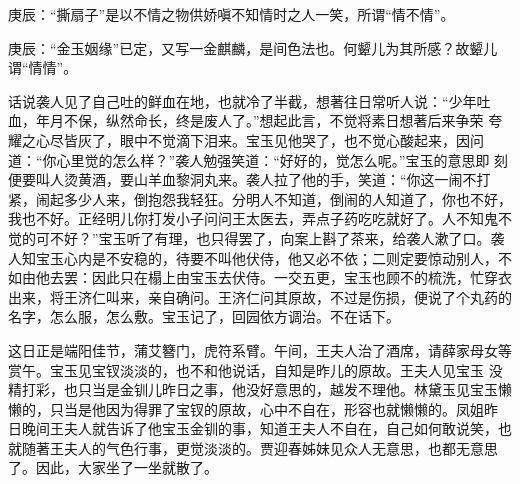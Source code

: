 

\begin{parag}
    \begin{note}庚辰：“撕扇子”是以不情之物供娇嗔不知情时之人一笑，所谓“情不情”。\end{note}
\end{parag}


\begin{parag}
    \begin{note}庚辰：“金玉姻缘”已定，又写一金麒麟，是间色法也。何颦儿为其所感？故颦儿谓“情情”。\end{note}
\end{parag}


\begin{parag}
    话说袭人见了自己吐的鲜血在地，也就冷了半截，想著往日常听人说：“少年吐血，年月不保，纵然命长，终是废人了。”想起此言，不觉将素日想著后来争荣 夸耀之心尽皆灰了，眼中不觉滴下泪来。宝玉见他哭了，也不觉心酸起来，因问道：“你心里觉的怎么样？”袭人勉强笑道：“好好的，觉怎么呢。”宝玉的意思即 刻便要叫人烫黄酒，要山羊血黎洞丸来。袭人拉了他的手，笑道：“你这一闹不打紧，闹起多少人来，倒抱怨我轻狂。分明人不知道，倒闹的人知道了，你也不好， 我也不好。正经明儿你打发小子问问王太医去，弄点子药吃吃就好了。人不知鬼不觉的可不好？”宝玉听了有理，也只得罢了，向案上斟了茶来，给袭人漱了口。袭人知宝玉心内是不安稳的，待要不叫他伏侍，他又必不依；二则定要惊动别人，不如由他去罢：因此只在榻上由宝玉去伏侍。一交五更，宝玉也顾不的梳洗，忙穿衣 出来，将王济仁叫来，亲自确问。王济仁问其原故，不过是伤损，便说了个丸药的名字，怎么服，怎么敷。宝玉记了，回园依方调治。不在话下。
\end{parag}


\begin{parag}
    这日正是端阳佳节，蒲艾簪门，虎符系臂。午间，王夫人治了酒席，请薛家母女等赏午。宝玉见宝钗淡淡的，也不和他说话，自知是昨儿的原故。王夫人见宝玉 没精打彩，也只当是金钏儿昨日之事，他没好意思的，越发不理他。林黛玉见宝玉懒懒的，只当是他因为得罪了宝钗的原故，心中不自在，形容也就懒懒的。凤姐昨 日晚间王夫人就告诉了他宝玉金钏的事，知道王夫人不自在，自己如何敢说笑，也就随著王夫人的气色行事，更觉淡淡的。贾迎春姊妹见众人无意思，也都无意思了。因此，大家坐了一坐就散了。
\end{parag}


